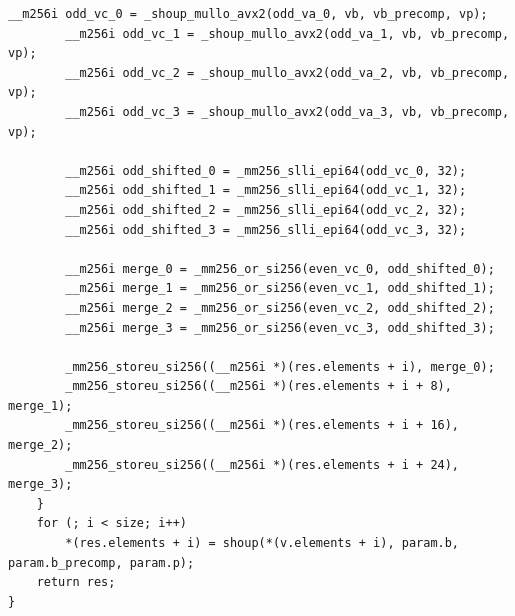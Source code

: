\documentclass{article}
\begin{document}
\begin{lstlisting}[caption = Variant 2 (AVX2), label = {list:variant2_avx2}]
        __m256i odd_vc_0 = _shoup_mullo_avx2(odd_va_0, vb, vb_precomp, vp);
        __m256i odd_vc_1 = _shoup_mullo_avx2(odd_va_1, vb, vb_precomp, vp);
        __m256i odd_vc_2 = _shoup_mullo_avx2(odd_va_2, vb, vb_precomp, vp);
        __m256i odd_vc_3 = _shoup_mullo_avx2(odd_va_3, vb, vb_precomp, vp);

        __m256i odd_shifted_0 = _mm256_slli_epi64(odd_vc_0, 32);
        __m256i odd_shifted_1 = _mm256_slli_epi64(odd_vc_1, 32);
        __m256i odd_shifted_2 = _mm256_slli_epi64(odd_vc_2, 32);
        __m256i odd_shifted_3 = _mm256_slli_epi64(odd_vc_3, 32);

        __m256i merge_0 = _mm256_or_si256(even_vc_0, odd_shifted_0);
        __m256i merge_1 = _mm256_or_si256(even_vc_1, odd_shifted_1);
        __m256i merge_2 = _mm256_or_si256(even_vc_2, odd_shifted_2);
        __m256i merge_3 = _mm256_or_si256(even_vc_3, odd_shifted_3);

        _mm256_storeu_si256((__m256i *)(res.elements + i), merge_0);
        _mm256_storeu_si256((__m256i *)(res.elements + i + 8), merge_1);
        _mm256_storeu_si256((__m256i *)(res.elements + i + 16), merge_2);
        _mm256_storeu_si256((__m256i *)(res.elements + i + 24), merge_3);
    }
    for (; i < size; i++)
        *(res.elements + i) = shoup(*(v.elements + i), param.b, param.b_precomp, param.p);
    return res;
}
\end{lstlisting}
\end{document}
